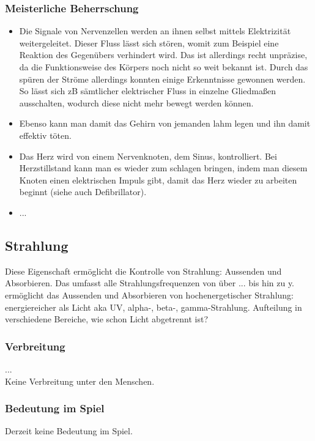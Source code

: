 \subsubsection{Meisterliche Beherrschung} 
\begin{itemize}
	\item Die Signale von Nervenzellen werden an ihnen selbst mittels Elektrizität weitergeleitet. Dieser Fluss lässt sich stören, womit zum Beispiel eine Reaktion des Gegenübers verhindert wird. Das ist allerdings recht unpräzise, da die Funktionsweise des Körpers noch nicht so weit bekannt ist. Durch das spüren der Ströme allerdings konnten einige Erkenntnisse gewonnen werden. So lässt sich zB sämtlicher elektrischer Fluss in einzelne Gliedmaßen ausschalten, wodurch diese nicht mehr bewegt werden können.
	\item Ebenso kann man damit das Gehirn von jemanden lahm legen und ihn damit effektiv töten.
	\item Das Herz wird von einem Nervenknoten, dem Sinus, kontrolliert. Bei Herzstillstand kann man es wieder zum schlagen bringen, indem man diesem Knoten einen elektrischen Impuls gibt, damit das Herz wieder zu arbeiten beginnt (siehe auch Defibrillator).
	\item ...
\end{itemize}



\subsection{Strahlung}\label{sec:strahlungsmagie}
Diese Eigenschaft ermöglicht die Kontrolle von Strahlung: Aussenden und Absorbieren. Das umfasst alle Strahlungsfrequenzen von  über ... bis hin zu y.
ermöglicht das Aussenden und Absorbieren von hochenergetischer Strahlung: energiereicher als Licht aka UV, alpha-, beta-, gamma-Strahlung. Aufteilung in verschiedene Bereiche, wie schon Licht abgetrennt ist? 

\subsubsection{Verbreitung}
...\\
Keine Verbreitung unter den Menschen.

\subsubsection{Bedeutung im Spiel}
Derzeit keine Bedeutung im Spiel.

